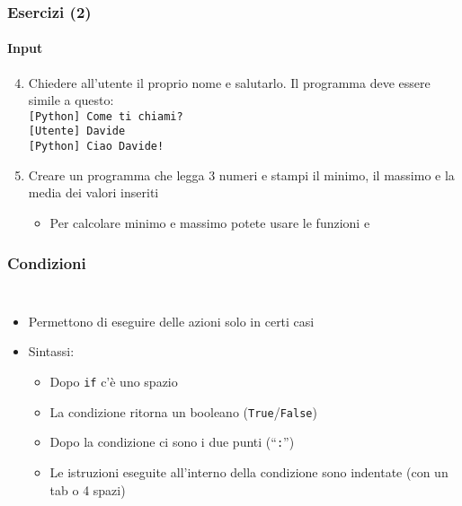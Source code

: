\begin{exerciseframe}
    \frametitle{Esercizi (2)}
    \framesubtitle{Input}

    \begin{enumerate}
        \setcounter{enumi}{3}
        \item Chiedere all'utente il proprio nome e salutarlo. Il programma deve essere simile a questo:\\
            \texttt{[Python] Come ti chiami?}\\
            \texttt{[Utente] Davide}\\
            \texttt{[Python] Ciao Davide!}

        \bigskip
        \item Creare un programma che legga 3 numeri e stampi il minimo, il massimo e la media dei valori inseriti
        \begin{itemize}
            \item Per calcolare minimo e massimo potete usare le funzioni  e 
        \end{itemize}
    \end{enumerate}
\end{exerciseframe}


\begin{contentframe}
    \frametitle{Condizioni}

    \begin{columns}
        \begin{itemize}
            \item Permettono di eseguire delle azioni solo in certi casi
    
            \bigskip
            \item Sintassi:
            \begin{itemize}
                \item Dopo \texttt{if} c'è uno spazio
                \item La condizione ritorna un booleano (\texttt{True}/\texttt{False})
                \item Dopo la condizione ci sono i due punti (``\texttt{:}'')
                \item Le istruzioni eseguite all'interno della condizione sono indentate (con un tab o 4 spazi)
            \end{itemize}
        \end{itemize}
        
        \centering
    \end{columns}
\end{contentframe}

